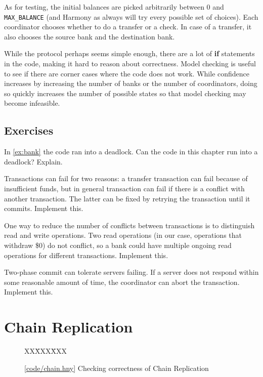 \documentclass{report}
\newcommand{\harmonysource}[1]{
\begin{tabbing}
XX\=XXX\=XXX\kill
    
\end{tabbing}
}
\newcommand{\harmonylink}[1]{%
[\href{https://harmony.cs.cornell.edu/#1}{\underline{#1}}]%
}
\newenvironment{code}{
\tcolorbox
}{
\endtcolorbox
}
\begin{document}
As for testing, the initial balances are picked arbitrarily between
0 and \texttt{MAX\_BALANCE} (and Harmony as always will try every
possible set of choices).
Each coordinator chooses whether to do a transfer or a check.  In
case of a transfer, it also chooses the source bank and the destination
bank.

While the protocol perhaps seems simple enough, there are a lot of
\textbf{if} statements in the code, making it hard to reason about
correctness.
Model checking is useful to see if there are corner
cases where the code does not work.
While confidence increases by
increasing the number of banks or the number of coordinators, doing so
quickly increases the number of possible states so that model checking
may become infeasible.

\section*{Exercises}
\begin{problems}
\item In \autoref{ex:bank} the code ran into a deadlock.  Can the code
in this chapter run into a deadlock?  Explain.
\item Transactions can fail for two reasons: a transfer transaction can
fail because of insufficient funds, but in general transaction can fail
if there is a conflict with another transaction.  The latter can be
fixed by retrying the transaction until it commits.  Implement this.
\item One way to reduce the number of conflicts between transactions
is to distinguish read and write operations.  Two read operations
(in our case, operations that withdraw \$0) do not conflict,
so a bank could have multiple ongoing read operations
for different transactions.  Implement this.
\item Two-phase commit can tolerate servers failing.  If a server does not
respond within some reasonable amount of time, the coordinator can abort
the transaction.  Implement this.
\end{problems}

\chapter{Chain Replication}
\label{ch:chain}

\begin{figure}
\begin{code}
\harmonysource{chain}
\end{code}
\caption{\harmonylink{code/chain.hny} Checking correctness of Chain Replication}
\label{fig:chain}
\end{figure}
\end{document}
